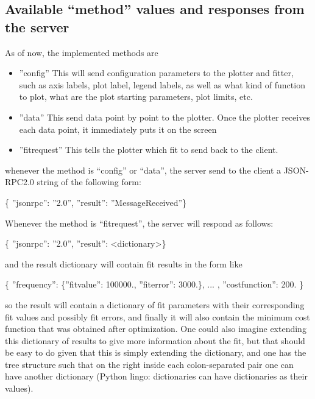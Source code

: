 \documentclass[11pt]{article} %
\begin{document}
\subsection{Available ``method'' values and responses from the server}

As of now, the implemented methods are 
\begin{itemize}
\item { {''}config{''}} This will send configuration parameters to the plotter and fitter, such as axis labels, plot label, legend labels, as well as what kind of function to plot, what are the plot starting parameters, plot limits, etc.
\item { {''}data{''}} This send data point by point to the plotter. Once the plotter receives each data point, it immediately puts it on the screen
\item { {''}fitrequest{''}} This tells the plotter which fit to send back to the client. 
\end{itemize}

whenever the method is ``config'' or ``data'', the server send to the client a JSON-RPC2.0 string of the following form: 

{ \{ {''}jsonrpc{''}: {''}2.0{''}, {''}result{''}: {''}MessageReceived{''}\}}

Whenever the method is ``fitrequest'', the server will respond as follows: 

{ \{ {''}jsonrpc{''}: {''}2.0{''}, {''}result{''}: <dictionary>\}}

and the result dictionary will contain fit results in the form like 

{ \{ {''}frequency{''}: \{{''}fitvalue{''}: 100000., {''}fiterror{''}: 3000.\}, ... , {''}costfunction{''}: 200. \}}

so the result will contain a dictionary of fit parameters with their corresponding fit values and possibly fit errors, and finally it will also contain the minimum cost function that was obtained after optimization.  One could also imagine extending this dictionary of results to give more information about the fit, but that should be easy to do given that this is simply extending the dictionary, and one has the tree structure such that on the right inside each colon-separated pair one can have another dictionary (Python lingo: dictionaries can have dictionaries as their values). 
\end{document}
